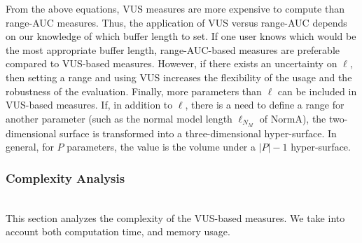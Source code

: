 From the above equations, VUS measures are more expensive to compute than range-AUC measures.
Thus, the application of VUS versus range-AUC depends on our knowledge of which buffer length to set. If one user knows which would be the most appropriate buffer length, range-AUC-based measures are preferable compared to VUS-based measures.
However, if there exists an uncertainty on $\ell$, then setting a range and using VUS increases the flexibility of the usage and the robustness of the evaluation. Finally, more parameters than $\ell$ can be included in VUS-based measures. If, in addition to $\ell$, there is a need to define a range for another parameter (such as the normal model length $\ell_{N_M}$ of NormA), the two-dimensional surface is transformed into a three-dimensional hyper-surface. In general, for $P$ parameters, the value is the volume under a $|P|-1$ hyper-surface. 






\subsubsection{{\bf Complexity Analysis}}\hfill\\

This section analyzes the complexity of the VUS-based measures. 
We take into account both computation time, and memory usage.

